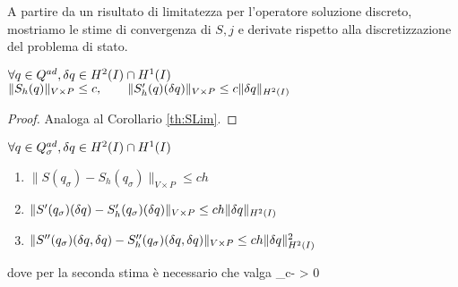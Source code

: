 A partire da un risultato di limitatezza per l'operatore soluzione discreto, mostriamo le stime di convergenza di $S,j$ e derivate rispetto alla discretizzazione del problema di stato.
\begin{lemma}
	$\forall q\in Q^{ad},{\delta q}\in H^2(I)\cap H^1(I)$\\$\|S_h(q)\|_{V\times P}\leq c,\qquad\|S'_h(q)({\delta q})\|_{V\times P}\leq c \|{\delta q}\|_{H^2(I)}$
\label{th:SShlim}
\end{lemma}
\begin{proof}
	Analoga al Corollario \ref{th:SLim}.
\end{proof}
\begin{lemma}
	$\forall q\in Q^{ad}_\sigma,{\delta q}\in H^2(I)\cap H^1(I)$
	\begin{enumerate}
		\item $\|S(q_\sigma)-S_h(q_\sigma)\|_{V\times P} \leq ch$
		\item $\|S'(q_\sigma)({\delta q})-S'_h(q_\sigma)({\delta q})\|_{V\times P} \leq ch\|{\delta q}\|_{H^2(I)}$
		\item $\|S''(q_\sigma)({\delta q},{\delta q})-S''_h(q_\sigma)({\delta q},{\delta q})\|_{V\times P} \leq ch\|{\delta q}\|_{H^2(I)}^2$
	\end{enumerate}
	dove per la seconda stima è necessario che valga
	\beq
		\alpha_c- > 0
	\label{eq:Hpcoeffh}
	\eeq
\label{th:SShcont}
\end{lemma}

